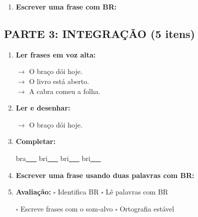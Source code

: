 \begin{exercicio}
\begin{enumerate}[resume]
  \item \textbf{Escrever uma frase com BR:}
  \begin{center}
  \underline{\hspace{12cm}}
  \end{center}

\end{enumerate}

\subsection*{PARTE 3: INTEGRAÇÃO (5 itens)}

\begin{enumerate}[resume]

  \item \textbf{Ler frases em voz alta:}
  \begin{center}
  $\rightarrow$ O braço dói hoje.\\
  $\rightarrow$ O livro está aberto.\\
  $\rightarrow$ A cabra comeu a folha.\\
  \end{center}

  \item \textbf{Ler e desenhar:}
  \begin{center}
  $\rightarrow$ O braço dói hoje.
  \end{center}
  \begin{center}
  \end{center}

  \item \textbf{Completar:}
  \begin{center}
  bra\underline{~~~} \quad bri\underline{~~~} \quad bri\underline{~~~} \quad bri\underline{~~~}
  \end{center}

  \item \textbf{Escrever uma frase usando duas palavras com BR:}
  \begin{center}
  \underline{\hspace{12cm}}
  \end{center}

  \item \textbf{Avaliação:} $\square$ Identifica BR \quad $\square$ Lê palavras com BR
  \begin{center}
  $\square$ Escreve frases com o som-alvo \quad $\square$ Ortografia estável
  \end{center}


\end{enumerate}
\end{exercicio}
